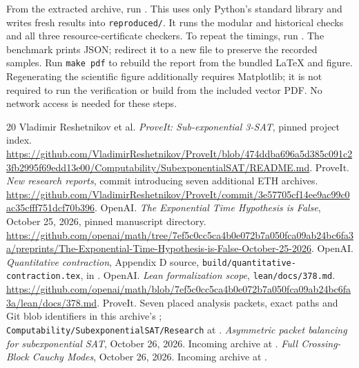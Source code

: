 \documentclass[11pt,letterpaper]{article}
\theoremstyle{definition}\newtheorem{definition}[theorem]{Definition}
\theoremstyle{remark}\newtheorem{remark}[theorem]{Remark}
\begin{document}
From the extracted archive, run .
This uses only Python's standard library and writes fresh results into
\texttt{reproduced/}. It runs the modular and historical checks and all three
resource-certificate checkers. To repeat the timings, run
.
The benchmark prints JSON; redirect it to a new file to preserve the
recorded samples. Run \texttt{make pdf} to rebuild the report from the
bundled LaTeX and figure. Regenerating the scientific figure additionally
requires Matplotlib; it is not required to run the verification or build
from the included vector PDF. No network access is needed for these steps.

\begin{thebibliography}{20}
 Vladimir Reshetnikov et al. \emph{ProveIt: Sub-exponential
3-SAT}, pinned project index.\newline
\url{https://github.com/VladimirReshetnikov/ProveIt/blob/474ddba696a5d385c091c23fb2995f69edd13e00/Computability/SubexponentialSAT/README.md}.
 ProveIt. \emph{New research reports}, commit introducing
seven additional ETH archives.\newline
\url{https://github.com/VladimirReshetnikov/ProveIt/commit/3e57705cf14ee9ac99c0ac35cfff751dcf70b396}.
 OpenAI. \emph{The Exponential Time Hypothesis is False},
October 25, 2026, pinned manuscript directory.\newline
\url{https://github.com/openai/math/tree/7ef5c0cc5ca4b0e072b7a050fca09ab24bc6fa3a/preprints/The-Exponential-Time-Hypothesis-is-False-October-25-2026}.
 OpenAI. \emph{Quantitative contraction}, Appendix D
source, \texttt{build/quantitative-contraction.tex}, in \cite{openai}.
 OpenAI. \emph{Lean formalization scope},
\texttt{lean/docs/378.md}.\newline
\url{https://github.com/openai/math/blob/7ef5c0cc5ca4b0e072b7a050fca09ab24bc6fa3a/lean/docs/378.md}.
 ProveIt. Seven placed analysis packets, exact paths and
Git blob identifiers in this archive's ;
\texttt{Computability/SubexponentialSAT/Research} at \cite{proveit}.
 \emph{Asymmetric packet balancing for subexponential
SAT}, October 26, 2026. Incoming archive
 at \cite{incoming}.
 \emph{Full Crossing-Block Cauchy Modes}, October 26, 2026.
Incoming archive  at \cite{incoming}.

\end{thebibliography}
\end{document}
